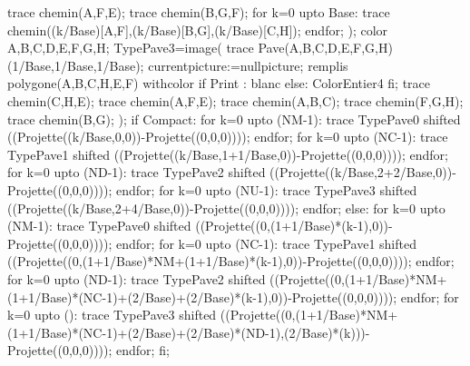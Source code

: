 {{\begin{Geometrie}[TypeTrace="Espace",CoinBG={u*(-10,-10)},CoinHD={u*(20,20)}]
      trace chemin(A,F,E);
      trace chemin(B,G,F);
      for k=0 upto Base:
      trace chemin((k/Base)[A,F],(k/Base)[B,G],(k/Base)[C,H]);
      endfor;
      );
      color A,B,C,D,E,F,G,H;
      TypePave3=image(
      trace Pave(A,B,C,D,E,F,G,H)(1/Base,1/Base,1/Base);
      currentpicture:=nullpicture;
      remplis polygone(A,B,C,H,E,F) withcolor if Print : blanc else: ColorEntier4 fi;
      trace chemin(C,H,E);
      trace chemin(A,F,E);
      trace chemin(A,B,C);
      trace chemin(F,G,H);
      trace chemin(B,G);
      );
      if Compact:
      for k=0 upto (NM-1):
      trace TypePave0 shifted ((Projette((k/Base,0,0))-Projette((0,0,0))));
      endfor;
      for k=0 upto (NC-1):
      trace TypePave1 shifted ((Projette((k/Base,1+1/Base,0))-Projette((0,0,0))));
      endfor;
      for k=0 upto (ND-1):
      trace TypePave2 shifted ((Projette((k/Base,2+2/Base,0))-Projette((0,0,0))));
      endfor;
      for k=0 upto (NU-1):
      trace TypePave3 shifted ((Projette((k/Base,2+4/Base,0))-Projette((0,0,0))));
      endfor;
      else:
      for k=0 upto (NM-1):
      trace TypePave0 shifted ((Projette((0,(1+1/Base)*(k-1),0))-Projette((0,0,0))));
      endfor;
      for k=0 upto (NC-1):
      trace TypePave1 shifted ((Projette((0,(1+1/Base)*NM+(1+1/Base)*(k-1),0))-Projette((0,0,0))));
      endfor;
      for k=0 upto (ND-1):
      trace TypePave2 shifted ((Projette((0,(1+1/Base)*NM+(1+1/Base)*(NC-1)+(2/Base)+(2/Base)*(k-1),0))-Projette((0,0,0))));
      endfor;
      for k=0 upto ():
      trace TypePave3 shifted ((Projette((0,(1+1/Base)*NM+(1+1/Base)*(NC-1)+(2/Base)+(2/Base)*(ND-1),(2/Base)*(k)))-Projette((0,0,0))));
      endfor;
      fi;
    \end{Geometrie}
  }%
}%